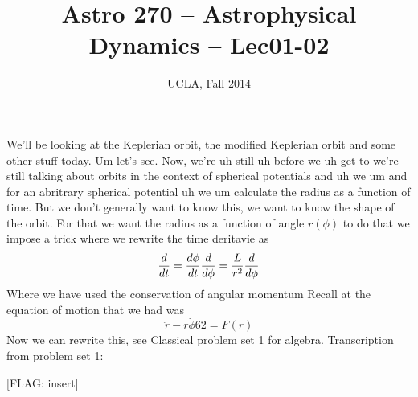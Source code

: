 


\title{Astro 270 -- Astrophysical Dynamics -- Lec01-02}
\author{UCLA, Fall 2014}


\setlength{\unitlength}{1mm}
\maketitle


We'll be looking at the Keplerian orbit, the modified Keplerian orbit and some other stuff today. Um let's see. Now, we're uh still uh before we uh get to we're still talking about orbits in the context of spherical potentials and uh we um and for an abritrary spherical potential uh we um calculate the radius as a function of time. But we don't generally want to know this, we want to know the shape of the orbit. For that we want the radius as a function of angle $r(\phi)$ to do that we impose a trick where we rewrite the time deritavie as 
\begin{equation}
\frac{d }{d t} = \frac{d \phi}{d t} \frac{d }{d \phi} = \frac{L}{r^2} \frac{d }{d \phi}
\end{equation}
Where we have used the conservation of angular momentum
Recall at the equation of motion that we had was
\begin{equation}
\ddot{r} - r\dot{\phi}62 = F(r)
\end{equation}
Now we can rewrite this, see Classical problem set 1 for algebra. Transcription from problem set 1:

[FLAG: insert]



